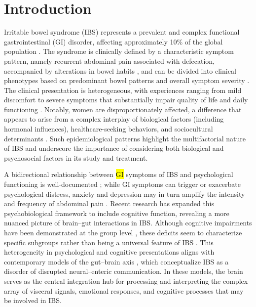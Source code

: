 \documentclass[diagnostics,article,accept,pdftex,moreauthors]{Definitions/mdpi}
\begin{document}
\section{Introduction}


Irritable bowel syndrome (IBS) represents a prevalent and complex functional gastrointestinal (GI) disorder, affecting approximately 10\% of the global population \cite{black2020global}. The syndrome is clinically defined by a characteristic symptom pattern, namely recurrent abdominal pain associated with defecation, accompanied by alterations in bowel habits \cite{lovell2012global}, and can be divided into clinical phenotypes based on predominant bowel patterns \cite{bonetto2021recent} and overall symptom severity \cite{drossman2022rome}. The clinical presentation is heterogeneous, with experiences ranging from mild discomfort to severe symptoms that substantially impair quality of life and daily functioning \cite{drossman2022rome}. Notably, women are disproportionately affected, a difference that appears to arise from a complex interplay of biological factors (including hormonal influences), healthcare-seeking behaviors, and sociocultural determinants \cite{heitkemper2003symptoms, meleine2014gender, kim2018sex, toner2000gender}. Such epidemiological patterns highlight the multifactorial nature of IBS and underscore the importance of considering both biological and psychosocial factors in its study and treatment. 


A bidirectional relationship between \hl{GI} %
symptoms of IBS and psychological functioning is well-documented \cite{lundervold2024decoding}; while GI symptoms can trigger or exacerbate psychological distress, anxiety and depression may in turn amplify the intensity and frequency of abdominal pain \cite{shiha2021physical}. Recent research has expanded this psychobiological framework to include cognitive function, revealing a more nuanced picture of brain--gut interactions in IBS. Although cognitive impairments have been demonstrated at the group level \cite{lam2019cognitive, wong2019nature}, these deficits seem to characterize specific subgroups rather than being a universal feature of IBS \cite{billing2023cognitive, lundervold2024decoding}. This heterogeneity in psychological and cognitive presentations aligns with contemporary models of the gut--brain axis \cite{Mayer2022, coss2014brain}, which conceptualize IBS as a disorder of disrupted neural--enteric communication. In these models, the brain serves as the central integration hub for processing and interpreting the complex array of visceral signals, emotional responses, and cognitive processes that may be involved in IBS. 
\end{document}
